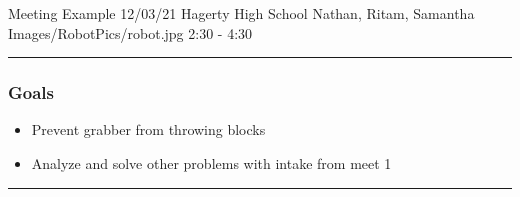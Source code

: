 \insertmeeting 
	{Meeting Example} 
	{12/03/21} 
	{Hagerty High School}
	{Nathan, Ritam, Samantha}
	{Images/RobotPics/robot.jpg}
	{2:30 - 4:30}
	
\noindent\hfil\rule{\textwidth}{.4pt}\hfil
\subsubsection*{Goals}
\begin{itemize}
    \item Prevent grabber from throwing blocks
    \item Analyze and solve other problems with intake from meet 1
   

\end{itemize} 

\noindent\hfil\rule{\textwidth}{.4pt}\hfil

